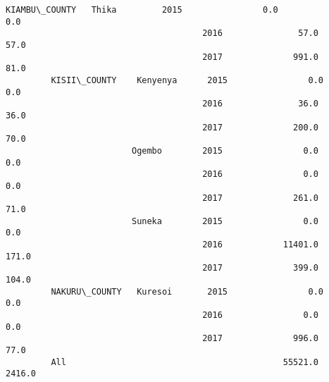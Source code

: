 \documentclass[11pt]{article}
\begin{document}
\begin{Verbatim}[commandchars=\\\{\}]
         KIAMBU\_COUNTY   Thika         2015                0.0                     0.0   
                                       2016               57.0                    57.0   
                                       2017              991.0                    81.0   
         KISII\_COUNTY    Kenyenya      2015                0.0                     0.0   
                                       2016               36.0                    36.0   
                                       2017              200.0                    70.0   
                         Ogembo        2015                0.0                     0.0   
                                       2016                0.0                     0.0   
                                       2017              261.0                    71.0   
                         Suneka        2015                0.0                     0.0   
                                       2016            11401.0                   171.0   
                                       2017              399.0                   104.0   
         NAKURU\_COUNTY   Kuresoi       2015                0.0                     0.0   
                                       2016                0.0                     0.0   
                                       2017              996.0                    77.0   
         All                                           55521.0                  2416.0   
         

\end{Verbatim}
\end{document}
